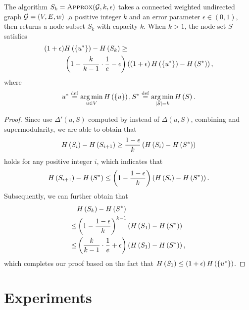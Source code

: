 \documentclass[sigconf]{acmart}
\begin{document}
\begin{theorem}
  The algorithm \(S_k=\textsc{Approx}(\mathcal{G},k,\epsilon)\) takes a connected weighted undirected graph \(\mathcal{G}=(V,E,w)\) ,a positive integer \(k\) and an error parameter \(\epsilon\in(0,1)\), then returns a node subset \(S_k\) with capacity \(k\). When \(k>1\), the node set \(S\) satisfies
  \begin{align*}
    \left( 1+\epsilon \right) & H\left(\left\{u^* \right\}\right)-H\left(S_k\right)\ge                                                                         \\
                       & \left( 1-\frac{k}{k-1}\cdot\frac{1}{e}-\epsilon \right)\left( \left( 1+\epsilon \right)H\left(\left\{u^* \right\}\right)-H\left(S^*\right) \right),
  \end{align*}
  where
  \[u^*\stackrel{\mathrm{def}}{=}\operatorname*{arg\,min}_{u\in V}H\left(\left\{u \right\}\right),S^*\stackrel{\mathrm{def}}{=}\operatorname*{arg\,min}_{\left|S \right|=k}H\left(S\right).\]
\end{theorem}
\begin{proof}
  Since  use \(\Delta'(u,S)\) computed by  instead of \(\Delta(u,S)\), combining  and supermodularity, we are able to obtain that
  \[H\left(S_i\right)-H\left(S_{i+1}\right)\ge\frac{1-\epsilon}{k}\left( H\left(S_i\right)-H\left(S^*\right) \right)\]
  holds for any positive integer \(i\), which indicates that
  \[H\left(S_{i+1}\right)-H\left(S^*\right)\le\left( 1-\frac{1-\epsilon}{k} \right)\left( H\left(S_i\right)-H\left(S^*\right) \right).\]
  Subsequently, we can further obtain that
  \begin{align*}
        & H\left(S_k\right)-H\left(S^*\right)                                                        \\
    \le & \left( 1-\frac{1-\epsilon}{k} \right)^{k-1}\left( H\left(S_1\right)-H\left(S^*\right) \right)            \\
    \le & \left( \frac{k}{k-1}\cdot\frac{1}{e}+\epsilon \right)\left( H\left(S_1\right)-H\left(S^*\right) \right),
  \end{align*}
  which completes our proof based on the fact that \(H\left(S_1\right)\le\left( 1+\epsilon \right)H\left(\left\{u^* \right\}\right)\).
\end{proof}

\section{Experiments}\label{sec:experiments}
\end{document}
